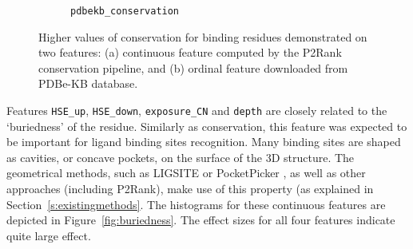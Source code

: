 \begin{figure}[!htbp]
\begin{subfigure}{.5\textwidth}
  \caption{\texttt{pdbekb\_conservation}}
\end{subfigure}
\caption{Higher values of conservation for binding residues demonstrated on two features: (a) continuous feature computed by the P2Rank conservation pipeline, and (b) ordinal feature downloaded from PDBe-KB database.}
\label{fig:conservation}
\end{figure}

Features \texttt{HSE\_up}, \texttt{HSE\_down}, \texttt{exposure\_CN} and \texttt{depth} are closely related to the `buriedness' of the residue. Similarly as conservation, this feature was expected to be important for ligand binding sites recognition. Many binding sites are shaped as cavities, or concave pockets, on the surface of the 3D structure. The geometrical methods, such as LIGSITE \cite{ligsite} or PocketPicker \cite{pocketpicker}, as well as other approaches (including P2Rank), make use of this property (as explained in Section~\ref{s:existingmethods}. The histograms for these continuous features are depicted in Figure~\ref{fig:buriedness}. The effect sizes for all four features indicate quite large effect.


